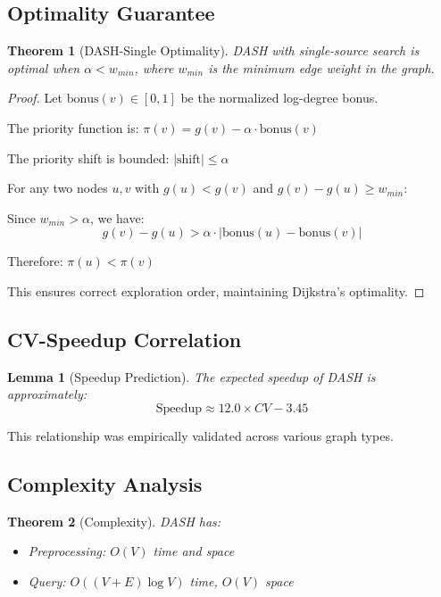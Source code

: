 \documentclass[11pt,a4paper]{article}
\newtheorem{theorem}{Theorem}
\newtheorem{lemma}{Lemma}
\begin{document}
\subsection{Optimality Guarantee}

\begin{theorem}[DASH-Single Optimality]
DASH with single-source search is optimal when $\alpha < w_{min}$, where 
$w_{min}$ is the minimum edge weight in the graph.
\end{theorem}

\begin{proof}
Let $\text{bonus}(v) \in [0, 1]$ be the normalized log-degree bonus.

The priority function is: $\pi(v) = g(v) - \alpha \cdot \text{bonus}(v)$

The priority shift is bounded: $|\text{shift}| \leq \alpha$

For any two nodes $u, v$ with $g(u) < g(v)$ and $g(v) - g(u) \geq w_{min}$:

Since $w_{min} > \alpha$, we have:
$$g(v) - g(u) > \alpha \cdot |\text{bonus}(u) - \text{bonus}(v)|$$

Therefore: $\pi(u) < \pi(v)$

This ensures correct exploration order, maintaining Dijkstra's optimality.
\end{proof}

\subsection{CV-Speedup Correlation}

\begin{lemma}[Speedup Prediction]
The expected speedup of DASH is approximately:
$$\text{Speedup} \approx 12.0 \times CV - 3.45$$
\end{lemma}

This relationship was empirically validated across various graph types.

\subsection{Complexity Analysis}

\begin{theorem}[Complexity]
DASH has:
\begin{itemize}
    \item Preprocessing: $O(V)$ time and space
    \item Query: $O((V + E) \log V)$ time, $O(V)$ space
\end{itemize}
\end{theorem}
\end{document}
